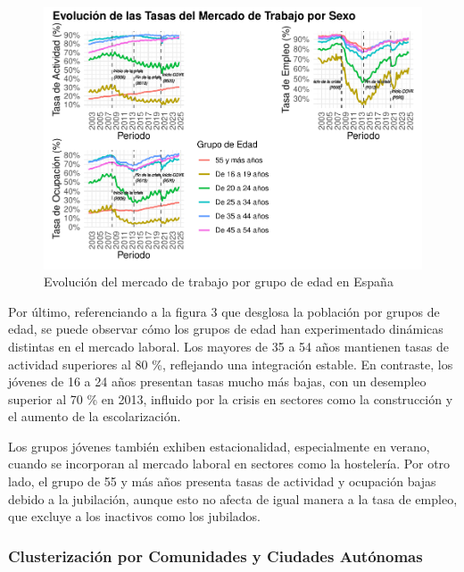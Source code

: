 \documentclass[Universitat de
València,article,submit,moreauthors,pdftex]{Definitions/mdpi}
\begin{document}
\begin{figure}[h]

{\centering \includegraphics[width=1\linewidth]{ProyectoAED2024_files/figure-latex/unnamed-chunk-30-1} 

}

\caption{Evolución del mercado de trabajo por grupo de edad en España}\label{fig:unnamed-chunk-30}
\end{figure}

Por último, referenciando a la figura 3 que desglosa la población por
grupos de edad, se puede observar cómo los grupos de edad han
experimentado dinámicas distintas en el mercado laboral. Los mayores de
35 a 54 años mantienen tasas de actividad superiores al 80 \%,
reflejando una integración estable. En contraste, los jóvenes de 16 a 24
años presentan tasas mucho más bajas, con un desempleo superior al 70 \%
en 2013, influido por la crisis en sectores como la construcción y el
aumento de la escolarización.

Los grupos jóvenes también exhiben estacionalidad, especialmente en
verano, cuando se incorporan al mercado laboral en sectores como la
hostelería. Por otro lado, el grupo de 55 y más años presenta tasas de
actividad y ocupación bajas debido a la jubilación, aunque esto no
afecta de igual manera a la tasa de empleo, que excluye a los inactivos
como los jubilados. \newpage

\subsubsection{\texorpdfstring{\textbf{Clusterización por Comunidades y
Ciudades
Autónomas}}{Clusterización por Comunidades y Ciudades Autónomas}}\label{clusterizaciuxf3n-por-comunidades-y-ciudades-autuxf3nomas}
\end{document}
